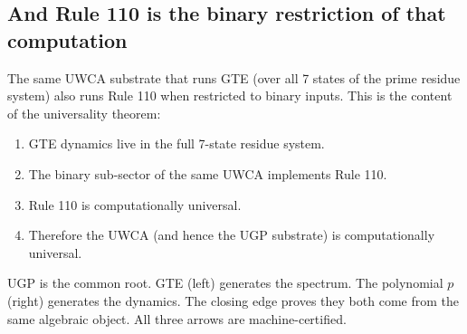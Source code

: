 \documentclass[11pt,a4paper]{article}
\begin{document}
\subsection{And Rule 110 is the binary restriction of that computation}

The same UWCA substrate that runs GTE (over all 7 states of the prime
residue system) also runs Rule 110 when restricted to binary inputs.
This is the content of the universality theorem:

\begin{enumerate}
  \item GTE dynamics live in the full 7-state residue system.
  \item The binary sub-sector of the same UWCA implements Rule 110.
  \item Rule 110 is computationally universal.
  \item Therefore the UWCA (and hence the UGP substrate) is computationally
    universal.
\end{enumerate}

\begin{tcolorbox}[colback=boxpurple,colframe=purple!50!black,
  title=The full triangle]
\begin{center}
\end{center}
\smallskip
UGP is the common root.  GTE (left) generates the spectrum.  The polynomial
$p$ (right) generates the dynamics.  The closing edge proves they both come
from the same algebraic object.  All three arrows are machine-certified.
\end{tcolorbox}
\end{document}

